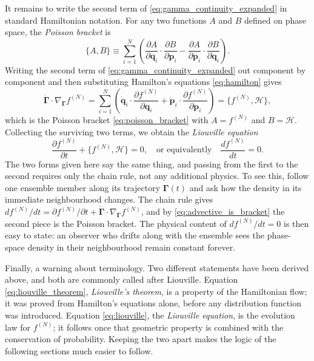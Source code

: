 \documentclass[12pt]{article}
\renewcommand{\vec}[1]{\bm{#1}}
\begin{document}
It remains to write the second term of
\eqref{eq:gamma_continuity_expanded} in standard Hamiltonian notation.
For any two functions $A$ and $B$ defined on phase space, the
\emph{Poisson bracket} is
%
\begin{equation}
  \{A,B\} \equiv \sum_{i=1}^{N}\!\left(
      \frac{\partial A}{\partial\vec q_i}\!\cdot\!\frac{\partial B}{\partial\vec p_i}
    - \frac{\partial A}{\partial\vec p_i}\!\cdot\!\frac{\partial B}{\partial\vec q_i}
    \right).
  \label{eq:poisson_bracket}
\end{equation}
%
Writing the second term of \eqref{eq:gamma_continuity_expanded} out
component by component and then substituting Hamilton's equations
\eqref{eq:hamilton} gives
%
\begin{equation}
  \dot{\vec\Gamma}\!\cdot\!\nabla_{\!\vec\Gamma}f^{(N)}
   = \sum_{i=1}^{N}\!\left(
       \dot{\vec q}_i\!\cdot\!\frac{\partial f^{(N)}}{\partial\vec q_i}
     + \dot{\vec p}_i\!\cdot\!\frac{\partial f^{(N)}}{\partial\vec p_i}\right)
   = \{f^{(N)},\mathcal H\},
  \label{eq:advective_is_bracket}
\end{equation}
%
which is the Poisson bracket \eqref{eq:poisson_bracket} with $A =
f^{(N)}$ and $B = \mathcal H$.  Collecting the surviving two terms, we
obtain the \emph{Liouville equation}
%
\begin{equation}
  \frac{\partial f^{(N)}}{\partial t} + \{f^{(N)},\mathcal H\} = 0,
  \quad\text{or equivalently}\quad
  \frac{df^{(N)}}{dt} = 0.
  \label{eq:liouville}
\end{equation}
%
The two forms given here say the same thing, and passing from the first
to the second requires only the chain rule, not any additional physics.
To see this, follow one ensemble member along its trajectory
$\vec\Gamma(t)$ and ask how the density in its immediate neighbourhood
changes.  The chain rule gives
$df^{(N)}/dt = \partial f^{(N)}/\partial t
+ \dot{\vec\Gamma}\!\cdot\!\nabla_{\!\vec\Gamma}f^{(N)}$, and by
\eqref{eq:advective_is_bracket} the second piece is the Poisson
bracket.  The physical content of $df^{(N)}/dt = 0$ is then easy to
state: an observer who drifts along with the ensemble sees the
phase-space density in their neighbourhood remain constant forever.

Finally, a warning about terminology.  Two different statements have
been derived above, and both are commonly called after Liouville.
Equation \eqref{eq:liouville_theorem}, \emph{Liouville's theorem}, is a
property of the Hamiltonian flow; it was proved from Hamilton's
equations alone, before any distribution function was introduced.
Equation \eqref{eq:liouville}, the \emph{Liouville equation}, is the
evolution law for $f^{(N)}$; it follows once that geometric property is
combined with the conservation of probability.  Keeping the two apart
makes the logic of the following sections much easier to follow.
\end{document}
